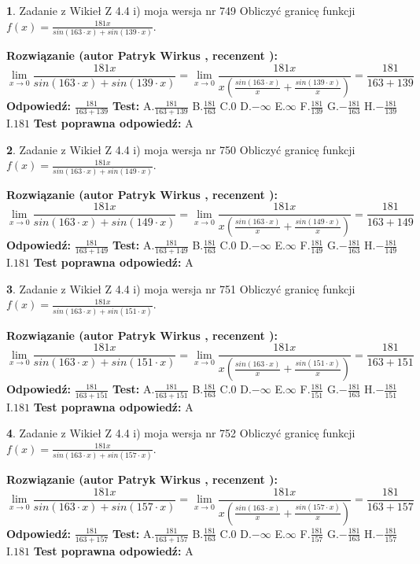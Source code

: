 \documentclass[12pt, a4paper]{article}
\theoremstyle{definition} %
\newtheorem{zad}{}
\newcommand{\zadStart}[1]{\begin{zad}#1\newline}
\newcommand{\zadStop}{\end{zad}}
\newcommand{\rozwStart}[2]{\noindent \textbf{Rozwiązanie (autor #1 , recenzent #2): }\newline}
\newcommand{\rozwStop}{\newline}
\newcommand{\odpStart}{\noindent \textbf{Odpowiedź:}\newline}
\newcommand{\odpStop}{\newline}
\newcommand{\testStart}{\noindent \textbf{Test:}\newline}
\newcommand{\testStop}{\newline}
\newcommand{\kluczStart}{\noindent \textbf{Test poprawna odpowiedź:}\newline}
\newcommand{\kluczStop}{\newline}
\begin{document}
\zadStart{Zadanie z Wikieł Z 4.4 i) moja wersja nr 749}
Obliczyć granicę funkcji $f(x)=\frac{181x}{sin(163\cdot x) +sin(139\cdot x)}$.
\zadStop
\rozwStart{Patryk Wirkus}{}
$$\lim\limits_{x\to 0}\frac{181x}{sin(163\cdot x) +sin(139\cdot x)}=\lim\limits_{x\to 0}\frac{181x}{x(\frac{sin(163\cdot x)}{x}+\frac{sin(139\cdot x)}{x})}=\frac{181}{163+139}$$
\rozwStop
\odpStart
$\frac{181}{163+139}$
\odpStop
\testStart
A.$\frac{181}{163+139}$
B.$\frac{181}{163}$
C.$0$
D.$-\infty$
E.$\infty$
F.$\frac{181}{139}$
G.$-\frac{181}{163}$
H.$-\frac{181}{139}$
I.$181$
\testStop
\kluczStart
A
\kluczStop



\zadStart{Zadanie z Wikieł Z 4.4 i) moja wersja nr 750}
Obliczyć granicę funkcji $f(x)=\frac{181x}{sin(163\cdot x) +sin(149\cdot x)}$.
\zadStop
\rozwStart{Patryk Wirkus}{}
$$\lim\limits_{x\to 0}\frac{181x}{sin(163\cdot x) +sin(149\cdot x)}=\lim\limits_{x\to 0}\frac{181x}{x(\frac{sin(163\cdot x)}{x}+\frac{sin(149\cdot x)}{x})}=\frac{181}{163+149}$$
\rozwStop
\odpStart
$\frac{181}{163+149}$
\odpStop
\testStart
A.$\frac{181}{163+149}$
B.$\frac{181}{163}$
C.$0$
D.$-\infty$
E.$\infty$
F.$\frac{181}{149}$
G.$-\frac{181}{163}$
H.$-\frac{181}{149}$
I.$181$
\testStop
\kluczStart
A
\kluczStop



\zadStart{Zadanie z Wikieł Z 4.4 i) moja wersja nr 751}
Obliczyć granicę funkcji $f(x)=\frac{181x}{sin(163\cdot x) +sin(151\cdot x)}$.
\zadStop
\rozwStart{Patryk Wirkus}{}
$$\lim\limits_{x\to 0}\frac{181x}{sin(163\cdot x) +sin(151\cdot x)}=\lim\limits_{x\to 0}\frac{181x}{x(\frac{sin(163\cdot x)}{x}+\frac{sin(151\cdot x)}{x})}=\frac{181}{163+151}$$
\rozwStop
\odpStart
$\frac{181}{163+151}$
\odpStop
\testStart
A.$\frac{181}{163+151}$
B.$\frac{181}{163}$
C.$0$
D.$-\infty$
E.$\infty$
F.$\frac{181}{151}$
G.$-\frac{181}{163}$
H.$-\frac{181}{151}$
I.$181$
\testStop
\kluczStart
A
\kluczStop



\zadStart{Zadanie z Wikieł Z 4.4 i) moja wersja nr 752}
Obliczyć granicę funkcji $f(x)=\frac{181x}{sin(163\cdot x) +sin(157\cdot x)}$.
\zadStop
\rozwStart{Patryk Wirkus}{}
$$\lim\limits_{x\to 0}\frac{181x}{sin(163\cdot x) +sin(157\cdot x)}=\lim\limits_{x\to 0}\frac{181x}{x(\frac{sin(163\cdot x)}{x}+\frac{sin(157\cdot x)}{x})}=\frac{181}{163+157}$$
\rozwStop
\odpStart
$\frac{181}{163+157}$
\odpStop
\testStart
A.$\frac{181}{163+157}$
B.$\frac{181}{163}$
C.$0$
D.$-\infty$
E.$\infty$
F.$\frac{181}{157}$
G.$-\frac{181}{163}$
H.$-\frac{181}{157}$
I.$181$
\testStop
\kluczStart
A
\kluczStop
\end{document}
